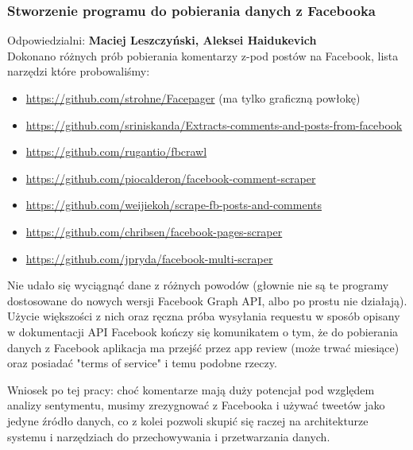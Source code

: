 \documentclass[a4paper,11pt, notitlepage ]{article}
\begin{document}
    \subsubsection{Stworzenie programu do pobierania danych z Facebooka} 
    Odpowiedzialni: \textbf{Maciej Leszczyński, Aleksei Haidukevich} \\
    Dokonano różnych prób pobierania komentarzy z-pod postów na Facebook, lista narzędzi które probowaliśmy:

    \begin{itemize}
    \item \href{https://github.com/strohne/Facepager}{https://github.com/strohne/Facepager} (ma tylko graficzną powłokę)
    \item \href{https://github.com/sriniskanda/Extracts-comments-and-posts-from-facebook}{https://github.com/sriniskanda/Extracts-comments-and-posts-from-facebook}
    \item \href{https://github.com/rugantio/fbcrawl}{https://github.com/rugantio/fbcrawl}
    \item \href{https://github.com/piocalderon/facebook-comment-scraper}{https://github.com/piocalderon/facebook-comment-scraper}
    \item \href{https://github.com/weijiekoh/scrape-fb-posts-and-comments}{https://github.com/weijiekoh/scrape-fb-posts-and-comments}
    \item \href{https://github.com/chribsen/facebook-pages-scraper}{https://github.com/chribsen/facebook-pages-scraper}
    \item \href{https://github.com/jpryda/facebook-multi-scraper}{https://github.com/jpryda/facebook-multi-scraper}
    \end{itemize}

    Nie udało się wyciągnąć dane z różnych powodów (głownie nie są te programy dostosowane do nowych wersji Facebook Graph API, albo po prostu nie działają). Użycie większości z nich oraz ręczna próba wysyłania requestu w sposób opisany w dokumentacji API Facebook kończy się komunikatem o tym, że do pobierania danych z Facebook aplikacja ma przejść przez app review (może trwać miesiące) oraz posiadać "terms of service" i temu podobne rzeczy.

    Wniosek po tej pracy: choć komentarze mają duży potencjał pod względem analizy sentymentu, musimy zrezygnować z Facebooka i używać tweetów jako jedyne źródło danych, co z kolei pozwoli skupić się raczej na architekturze systemu i narzędziach do przechowywania i przetwarzania danych.
\end{document}
